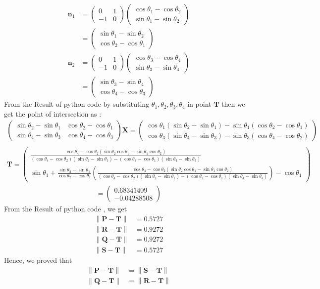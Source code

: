 \documentclass[10pt]{article}
\providecommand{\brak}[1]{\ensuremath{\left(#1\right)}}
\providecommand{\norm}[1]{\left\lVert#1\right\rVert}
\newcommand{\myvec}[1]{\ensuremath{\begin{pmatrix}#1\end{pmatrix}}}
\let\vec\mathbf
\begin{document}
\begin{enumerate}
\begin{align}
\vec{n}_1&=\myvec{0&1\\-1&0}\myvec{\cos \theta_1-\cos \theta_2\\\sin \theta_1-\sin \theta_2}\\
&=\myvec{\sin \theta_1-\sin \theta_2\\\cos \theta_2-\cos \theta_1}\\
\vec{n}_2&=\myvec{0&1\\-1&0}\myvec{\cos\theta_3-\cos \theta_4\\\sin \theta_3-\sin \theta_4}\\
&=\myvec{\sin \theta_3-\sin \theta_4\\\cos \theta_4-\cos \theta_3}
\end{align}
From the Result of python code by substituting $\theta_1,\theta_2,\theta_3,\theta_4$ in point $\vec{T}$ then we get the point of intersection as :
\begin{multline}
\myvec{\sin \theta_2-\sin \theta_1&\cos \theta_2-\cos \theta_1\\\sin \theta_4-\sin \theta_3&\cos \theta_4-\cos \theta_3}\vec{X}=\myvec{\cos \theta_1\brak{\sin \theta_2-\sin \theta_1}-\sin \theta_1\brak{\cos \theta_2-\cos \theta_1}\\\cos \theta_3\brak{\sin \theta_4-\sin \theta_3}-\sin \theta_3\brak{\cos \theta_4-\cos \theta_2}}\\
\end{multline}
\begin{multline}
\vec{T}=\myvec{\frac{\cos \theta_4-\cos \theta_2\brak{\sin \theta_2 \cos \theta_1-\sin \theta_1 \cos \theta_2}}{\brak{\cos\theta_4-\cos \theta_2}\brak{\sin \theta_2-\sin \theta_1}-\brak{\cos \theta_2-\cos \theta_1}\brak{\sin \theta_4-\sin \theta_3}}\\[8pt]\sin \theta_1+\frac{\sin \theta_2-\sin \theta_1}{\cos \theta_2-\cos \theta_1}\brak{\frac{\cos \theta_4-\cos \theta_2\brak{\sin \theta_2\cos \theta_1-\sin \theta_1\cos \theta_2}}{\brak{\cos \theta_4-\cos \theta_2}\brak{\sin \theta_2-\sin \theta_1}-\brak{\cos \theta_2-\cos \theta_1}\brak{\sin \theta_4-\sin \theta_3}}}-\cos \theta_1}
\end{multline} 	
\begin{align}
=\myvec{0.68341409\\-0.04288508}
\end{align}
From the Result of python code , we get
\begin{align}
\norm{\vec{P}-\vec{T}}&=0.5727\\
\norm{\vec{R}-\vec{T}}&=0.9272\\
\norm{\vec{Q}-\vec{T}}&=0.9272\\
\norm{\vec{S}-\vec{T}}&=0.5727
\end{align}
Hence, we proved that
\begin{align}
\norm{\vec{P}-\vec{T}}&=\norm{\vec{S}-\vec{T}}\\
\norm{\vec{Q}-\vec{T}}&=\norm{\vec{R}-\vec{T}}
\end{align} 
\end{enumerate}
\end{document}
